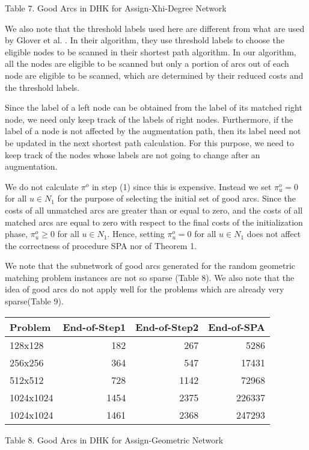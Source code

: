 \vskip 2pt
{ Table 7. Good Arcs in DHK for Assign-Xhi-Degree Network}
\vskip 5pt

We also note that the threshold labels used here are different
from what are used by Glover et al. \cite{glo1}. In their
algorithm, they use threshold labels to choose the eligible nodes
to be scanned in their shortest path algorithm. In our algorithm,
all the nodes are eligible to be scanned but only a portion of
arcs out of each node are eligible to be scanned, which are determined by 
their reduced costs and the threshold labels.

Since the label of a left node can be obtained from the label of its
matched right node, we need only keep track of the labels of right
nodes. Furthermore, if the label of a node is not affected by the
augmentation path, then its label need not be updated in the next
shortest path calculation. For this purpose, we need to keep track
of the nodes whose labels are not going to change after an
augmentation.

We do not calculate $\pi^o$ in step (1) since this is expensive.
Instead we set $\pi^o_u = 0$ for all $u\in N_1$ for the purpose
of selecting the initial set of good arcs. Since the costs of
all unmatched arcs are greater than or equal to zero, and the costs of
all matched arcs are equal to zero with respect to the final costs of
the initialization phase, $\pi^o_u\geq 0$ for all $u\in N_1$.
Hence, setting $\pi^o_u = 0$ for all $u\in N_1$ does not affect the
correctness of procedure SPA nor of Theorem 1.


We note that the subnetwork of good arcs generated for the
random geometric matching problem instances are not so sparse
(Table 8).
We also note that the idea of good arcs do not apply well for
the problems which are already very sparse(Table 9).

\vskip 5pt
{\small
\begin{tabular}{|l|rrr|} \hline
Problem &End-of-Step1 &End-of-Step2 &End-of-SPA\\ \hline
128x128& 182& 267& 5286\\ 
256x256& 364& 547& 17431\\ 
512x512& 728& 1142& 72968\\ 
1024x1024& 1454& 2375& 226337\\ 
1024x1024& 1461& 2368& 247293\\ \hline
\end{tabular}
}

\vskip 2pt
{Table 8. Good Arcs in DHK for Assign-Geometric Network}
\vskip 5pt

